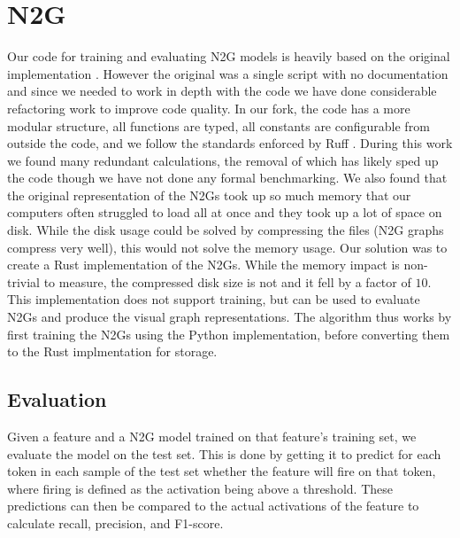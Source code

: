 \section{N2G}
Our code for training and evaluating N2G models is heavily based on the original implementation \parencite{foote_apartresearchneuron2graph_2024}.
However the original was a single script with no documentation and since we needed to work in depth with the code we have done considerable refactoring work to improve code quality.
In our fork, the code has a more modular structure, all functions are typed, all constants are configurable from outside the code, and we follow the standards enforced by Ruff \parencite{marsh_astral-shruff_2024}.
During this work we found many redundant calculations, the removal of which has likely sped up the code though we have not done any formal benchmarking.
We also found that the original representation of the N2Gs took up so much memory that our computers often struggled to load all at once and they took up a lot of space on disk.
While the disk usage could be solved by compressing the files (N2G graphs compress very well), this would not solve the memory usage.
Our solution was to create a Rust implementation of the N2Gs.
While the memory impact is non-trivial to measure, the compressed disk size is not and it fell by a factor of $10$.
This implementation does not support training, but can be used to evaluate N2Gs and produce the visual graph representations.
The algorithm thus works by first training the N2Gs using the Python implementation, before converting them to the Rust implmentation for storage.

\subsection{Evaluation}
Given a feature and a N2G model trained on that feature's training set, we evaluate the model on the test set.
This is done by getting it to predict for each token in each sample of the test set whether the feature will fire on that token, where firing is defined as the activation being above a threshold.
These predictions can then be compared to the actual activations of the feature to calculate recall, precision, and F1-score.


